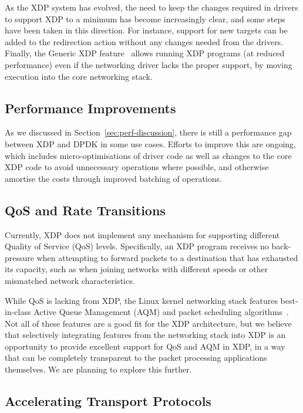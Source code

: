 \documentclass[sigconf]{acmart}
\begin{document}
As the XDP system has evolved, the need to keep the changes required in drivers
to support XDP to a minimum has become increasingly clear, and some steps have
been taken in this direction. For instance, support for new targets can be added
to the redirection action without any changes needed from the drivers. Finally,
the Generic XDP feature~\cite{generic-xdp} allows running XDP programs (at
reduced performance) even if the networking driver lacks the proper support, by
moving execution into the core networking stack.

\subsection{Performance Improvements}
\label{sec:perf-improvements}
As we discussed in Section~\ref{sec:perf-discussion}, there is still a
performance gap between XDP and DPDK in some use cases. Efforts to improve this
are ongoing, which includes micro-optimisations of driver code as well as
changes to the core XDP code to avoid unnecessary operations where possible, and
otherwise amortise the costs through improved batching of operations.

\subsection{QoS and Rate Transitions}
\label{sec:handl-rate-trans}
Currently, XDP does not implement any mechanism for supporting different Quality
of Service (QoS) levels. Specifically, an XDP program receives no back-pressure
when attempting to forward packets to a destination that has exhausted its
capacity, such as when joining networks with different speeds or other
mismatched network characteristics.

While QoS is lacking from XDP, the Linux kernel networking stack features
best-in-class Active Queue Management (AQM) and packet scheduling
algorithms~\cite{good-bad-wifi}. Not all of these features are a good fit for
the XDP architecture, but we believe that selectively integrating features from
the networking stack into XDP is an opportunity to provide excellent support for
QoS and AQM in XDP, in a way that can be completely transparent to the packet
processing applications themselves. We are planning to explore this further.

\subsection{Accelerating Transport Protocols}
\label{sec:accel-transp-prot}
\end{document}
